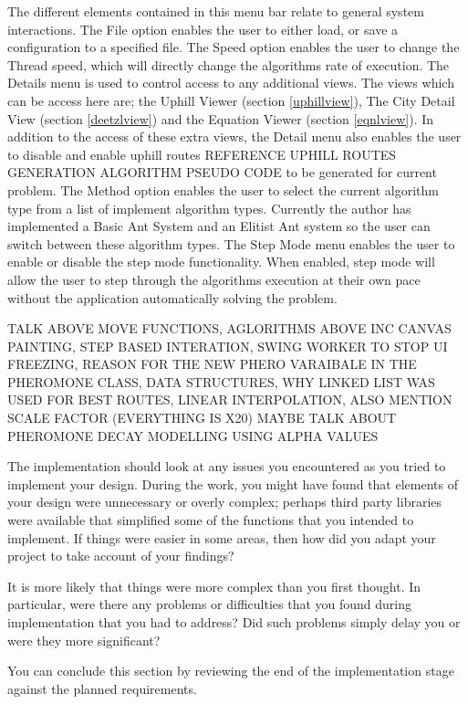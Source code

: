 The different elements contained in this menu bar relate to general system interactions. The File option enables the user to either load, or save a configuration to a specified file. The Speed option enables the user to change the Thread speed, which will directly change the algorithms rate of execution. The Details menu is used to control access to any additional views. The views which can be access here are; the Uphill Viewer (section \ref{uphillview}), The City Detail View (section \ref{deetzlview}) and the Equation Viewer (section \ref{eqnlview}). In addition to the access of these extra views, the Detail menu also enables the user to disable and enable uphill routes \Large REFERENCE UPHILL ROUTES GENERATION ALGORITHM PSEUDO CODE \normalsize to be generated for current problem. The Method option enables the user to select the current algorithm type from a list of implement algorithm types. Currently the author has implemented a Basic Ant System and an Elitist Ant system so the user can switch between these algorithm types. The Step Mode menu enables the user to enable or disable the step mode functionality. When enabled, step mode will allow the user to step through the algorithms execution at their own pace without the application automatically solving the problem.

\Large TALK ABOVE MOVE FUNCTIONS, AGLORITHMS ABOVE INC CANVAS PAINTING, STEP BASED INTERATION, SWING WORKER TO STOP UI FREEZING, REASON FOR THE NEW PHERO VARAIBALE IN THE PHEROMONE CLASS, DATA STRUCTURES, WHY LINKED LIST WAS USED FOR BEST ROUTES, LINEAR INTERPOLATION, ALSO MENTION SCALE FACTOR (EVERYTHING IS X20) MAYBE TALK ABOUT PHEROMONE DECAY MODELLING USING ALPHA VALUES \normalsize


The implementation should look at any issues you encountered as you tried to implement your design. During the work, you might have found that elements of your design were unnecessary or overly complex; perhaps third party libraries were available that simplified some of the functions that you intended to implement. If things were easier in some areas, then how did you adapt your project to take account of your findings?

It is more likely that things were more complex than you first thought. In particular, were there any problems or difficulties that you found during implementation that you had to address? Did such problems simply delay you or were they more significant? 

You can conclude this section by reviewing the end of the implementation stage against the planned requirements. 

